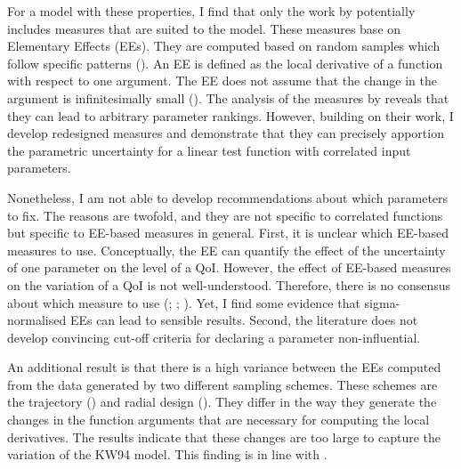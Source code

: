 For a model with these properties, I find that only the work by \cite{ge2014efficient} potentially includes measures that are suited to the model. These measures base on Elementary Effects (EEs). They are computed based on random samples which follow specific patterns (\cite{campolongo2011screening}). An EE is defined as the local derivative of a function with respect to one argument. The EE does not assume that the change in the argument is infinitesimally small (\cite{Morris.1991}). The analysis of the measures by \cite{ge2014efficient} reveals that they can lead to arbitrary parameter rankings. However, building on their work, I develop redesigned measures and demonstrate that they can precisely apportion the parametric uncertainty for a linear test function with correlated input parameters.

Nonetheless, I am not able to develop recommendations about which parameters to fix. The reasons are twofold, and they are not specific to correlated functions but specific to EE-based measures in general. First, it is unclear which EE-based measures to use. Conceptually, the EE can quantify the effect of the uncertainty of one parameter on the level of a QoI. However, the effect of EE-based measures on the variation of a QoI is not well-understood. Therefore, there is no consensus about which measure to use (\cite{campolongo2007effective}; \cite{kucherenko2009derivative}; \cite{Smith.2014}). Yet, I find some evidence that sigma-normalised EEs can lead to sensible results.
Second, the literature does not develop convincing cut-off criteria for declaring a parameter non-influential.

An additional result is that there is a high variance between the EEs computed from the data generated by two different sampling schemes. These schemes are the trajectory (\cite{Morris.1991}) and radial design (\cite{saltelli2010variance}). They differ in the way they generate the changes in the function arguments that are necessary for computing the local derivatives. The results indicate that these changes are too large to capture the variation of the KW94 model. This finding is in line with \cite{kucherenko2009derivative}.\\

